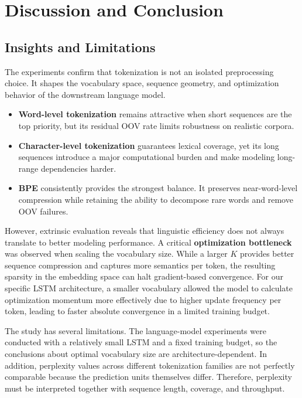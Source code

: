 \section{Discussion and Conclusion}

\subsection{Insights and Limitations}
The experiments confirm that tokenization is not an isolated preprocessing choice. It shapes the vocabulary space, sequence geometry, and optimization behavior of the downstream language model.

\begin{itemize}
    \item \textbf{Word-level tokenization} remains attractive when short sequences are the top priority, but its residual OOV rate limits robustness on realistic corpora.
    \item \textbf{Character-level tokenization} guarantees lexical coverage, yet its long sequences introduce a major computational burden and make modeling long-range dependencies harder.
    \item \textbf{BPE} consistently provides the strongest balance. It preserves near-word-level compression while retaining the ability to decompose rare words and remove OOV failures.
\end{itemize}

However, extrinsic evaluation reveals that linguistic efficiency does not always translate to better modeling performance. A critical \textbf{optimization bottleneck} was observed when scaling the vocabulary size. While a larger $K$ provides better sequence compression and captures more semantics per token, the resulting sparsity in the embedding space can halt gradient-based convergence. For our specific LSTM architecture, a smaller vocabulary allowed the model to calculate optimization momentum more effectively due to higher update frequency per token, leading to faster absolute convergence in a limited training budget.

The study has several limitations. The language-model experiments were conducted with a relatively small LSTM and a fixed training budget, so the conclusions about optimal vocabulary size are architecture-dependent. In addition, perplexity values across different tokenization families are not perfectly comparable because the prediction units themselves differ. Therefore, perplexity must be interpreted together with sequence length, coverage, and throughput.

